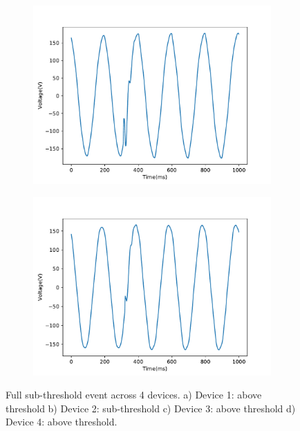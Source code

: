 \begin{figure}[h]
    \begin{subfigure}{0.49\textwidth}
        \centering
        \includegraphics[width=1\linewidth]{img/napali_eval/raw_gridwide_sub_full3.pdf}
        \caption{}
        \label{fig:expdes:9:3}
    \end{subfigure}
    \begin{subfigure}{0.49\textwidth}
        \centering
        \includegraphics[width=1\linewidth]{img/napali_eval/raw_gridwide_sub_full4.pdf}
        \caption{}
        \label{fig:expdes:9:4}
    \end{subfigure}
    \caption{Full sub-threshold event across 4 devices.
    a) Device 1: above threshold b) Device 2: sub-threshold c) Device 3: above threshold d) Device 4: above threshold.}
    \label{fig:expdes:9}
\end{figure}

